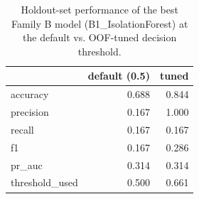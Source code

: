 \begin{table}[htbp]
\caption{Holdout-set performance of the best Family B model (B1_IsolationForest) at the default vs. OOF-tuned decision threshold.}
\label{tab:B1_IsolationForest_holdout}
\begin{tabular}{lrr}
\toprule
 & default (0.5) & tuned \\
\midrule
accuracy & 0.688 & 0.844 \\
precision & 0.167 & 1.000 \\
recall & 0.167 & 0.167 \\
f1 & 0.167 & 0.286 \\
pr\_auc & 0.314 & 0.314 \\
threshold\_used & 0.500 & 0.661 \\
\bottomrule
\end{tabular}
\end{table}
